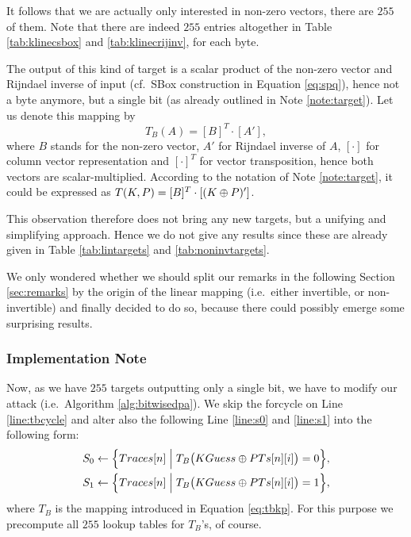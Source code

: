 It follows that we are actually only interested in non-zero vectors, there are $255$ of them. Note that there are indeed $255$ entries altogether in Table \ref{tab:klinecsbox} and \ref{tab:klinecrijinv}, for each byte.

The output of this kind of target is a scalar product of the non-zero vector and Rijndael inverse of input (cf.\ SBox construction in Equation \ref{eq:spq}), hence not a byte anymore, but a single bit (as already outlined in Note \ref{note:target}). Let us denote this mapping by
\begin{equation}
\label{eq:tbkp}
	T_B(A) = [B]^T\cdot [A'] ,
\end{equation}
where $B$ stands for the non-zero vector, $A'$ for Rijndael inverse of $A$, $[\cdot]$ for column vector representation and $[\cdot]^T$ for vector transposition, hence both vectors are scalar-multiplied. According to the notation of Note \ref{note:target}, it could be expressed as $T(K,P) = [B]^T\cdot [(K\oplus P)']$.

This observation therefore does not bring any new targets, but a unifying and simplifying approach. Hence we do not give any results since these are already given in Table \ref{tab:lintargets} and \ref{tab:noninvtargets}.

We only wondered whether we should split our remarks in the following Section \ref{sec:remarks} by the origin of the linear mapping (i.e.\ either invertible, or non-invertible) and finally decided to do so, because there could possibly emerge some surprising results.

\subsubsection{Implementation Note}
	
	Now, as we have $255$ targets outputting only a single bit, we have to modify our attack (i.e.\ Algorithm \ref{alg:bitwisedpa}). We skip the forcycle on Line \ref{line:tbcycle} and alter also the following Line \ref{line:s0} and \ref{line:s1} into the following form:
	\begin{align*}
		S_0 &\gets \Bigl\{ Traces[n] \Bigm| T_B\bigl(KGuess\oplus PTs[n][i]\bigr) = 0 \Bigr\} , \\
		S_1 &\gets \Bigl\{ Traces[n] \Bigm| T_B\bigl(KGuess\oplus PTs[n][i]\bigr) = 1 \Bigr\} ,
	\end{align*}
	where $T_B$ is the mapping introduced in Equation \ref{eq:tbkp}. For this purpose we precompute all $255$ lookup tables for $T_B$'s, of course.
	
